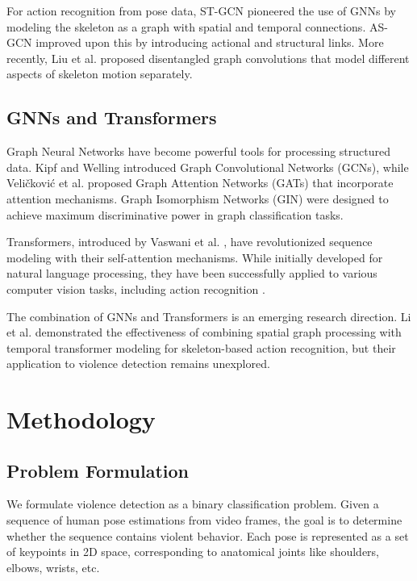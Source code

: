 \documentclass[conference]{IEEEtran}
\begin{document}
For action recognition from pose data, ST-GCN \cite{yan2018spatial} pioneered the use of GNNs by modeling the skeleton as a graph with spatial and temporal connections. AS-GCN \cite{li2019actional} improved upon this by introducing actional and structural links. More recently, Liu et al. \cite{liu2020disentangling} proposed disentangled graph convolutions that model different aspects of skeleton motion separately.

\subsection{GNNs and Transformers}
Graph Neural Networks have become powerful tools for processing structured data. Kipf and Welling \cite{kipf2017semi} introduced Graph Convolutional Networks (GCNs), while Veličković et al. \cite{velivckovic2018graph} proposed Graph Attention Networks (GATs) that incorporate attention mechanisms. Graph Isomorphism Networks (GIN) \cite{xu2018powerful} were designed to achieve maximum discriminative power in graph classification tasks.

Transformers, introduced by Vaswani et al. \cite{vaswani2017attention}, have revolutionized sequence modeling with their self-attention mechanisms. While initially developed for natural language processing, they have been successfully applied to various computer vision tasks, including action recognition \cite{girdhar2019video}.

The combination of GNNs and Transformers is an emerging research direction. Li et al. \cite{li2021spatio} demonstrated the effectiveness of combining spatial graph processing with temporal transformer modeling for skeleton-based action recognition, but their application to violence detection remains unexplored.

\section{Methodology}

\subsection{Problem Formulation}
We formulate violence detection as a binary classification problem. Given a sequence of human pose estimations from video frames, the goal is to determine whether the sequence contains violent behavior. Each pose is represented as a set of keypoints in 2D space, corresponding to anatomical joints like shoulders, elbows, wrists, etc.
\end{document}

